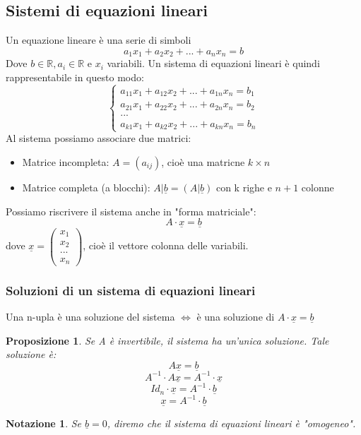 \documentclass[12pt]{article}
\newenvironment{para}{\begin{adjustwidth}{13mm}{}}{\end{adjustwidth}}
\newtheorem{Proposizione}{Proposizione}[subsection]
\newtheorem{Notazione}{Notazione}[subsection]
\begin{document}
\begin{para}
\subsection{Sistemi di equazioni lineari}
Un equazione lineare è una serie di simboli $$a_1x_1 + a_2x_2+...+a_nx_n = b$$ Dove $b \in \mathbb{R}, a_i\in \mathbb{R}$ e $x_i$ variabili. Un sistema di equazioni lineari è quindi rappresentabile in questo modo: 
$$\begin{cases}
a_{11}x_1 + a_{12}x_2 + ... + a_{1n}x_n = b_1 \\
a_{21}x_1 + a_{22}x_2 + ... + a_{2n}x_n = b_2 \\
... \\
a_{k1}x_1 + a_{k2}x_2 + ... + a_{kn}x_n = b_n
\end{cases}$$ Al sistema possiamo associare due matrici:
\begin{itemize}
    \item Matrice incompleta: $A = (a_{ij})$, cioè una matricne $k \times n$
    \item Matrice completa (a blocchi): $A | \underline{b} = (A|\underline{b})$ con k righe e $n+1$ colonne
\end{itemize}
Possiamo riscrivere il sistema anche in "forma matriciale": $$A \cdot \underline{x} = \underline{b}$$ dove $\underline{x} = \begin{pmatrix}
    x_1 \\
    x_2 \\
    ... \\
    x_n
\end{pmatrix}$, cioè il vettore colonna delle variabili.
\newpage
\subsubsection{Soluzioni di un sistema di equazioni lineari}
Una n-upla è una soluzione del sistema $\Leftrightarrow$ è una soluzione di $A \cdot \underline{x} = \underline{b}$
\begin{Proposizione}
Se A è invertibile, il sistema ha un'unica soluzione. Tale soluzione è: $$A\underline{x} = \underline{b}$$
$$A^{-1} \cdot A\underline{x} = A^{-1} \cdot \underline{x}$$ $$Id_n \cdot \underline{x} = A^{-1} \cdot \underline{b}$$ $$\underline{x} = A^{-1} \cdot \underline{b}$$
\end{Proposizione}
\begin{Notazione}
Se $\underline{b} = 0$, diremo che il sistema di equazioni lineari è "omogeneo".
\end{Notazione}


\end{para}
\end{document}
